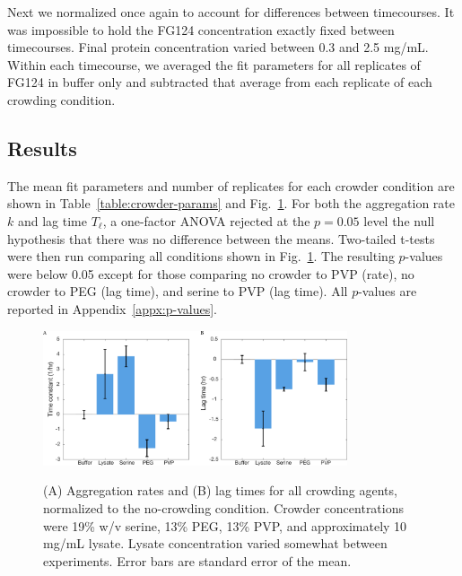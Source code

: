 Next we normalized once again to account for differences between timecourses.  It was impossible to hold the FG124 concentration exactly fixed between timecourses.  Final protein concentration varied between 0.3 and 2.5 mg/mL. Within each timecourse, we averaged the fit parameters for all replicates of FG124 in buffer only and subtracted that average from each replicate of each crowding condition.

\subsection{Results}

The mean fit parameters and number of replicates for each crowder condition are shown in Table~\ref{table:crowder-params} and Fig.~\ref{fig:tht-all-conditions}.  For both the aggregation rate $k$ and lag time $T_\ell$, a one-factor ANOVA rejected at the $p=0.05$ level the null hypothesis that there was no difference between the means.  Two-tailed t-tests were then run comparing all conditions shown in Fig.~\ref{fig:tht-all-conditions}.  The resulting $p$-values were below 0.05 except for those comparing no crowder to PVP (rate), no crowder to PEG (lag time), and serine to PVP (lag time).  All $p$-values are reported in Appendix~\ref{appx:p-values}.


\begin{figure}
\caption[Aggregation rates and lag times for all crowding agents.]{(A) Aggregation rates and (B) lag times for all crowding agents, normalized to the no-crowding condition.  Crowder concentrations were 19\% w/v serine, 13\% PEG, 13\% PVP, and approximately 10 mg/mL lysate.  Lysate concentration varied somewhat between experiments. Error bars are standard error of the mean.}
\centering
\includegraphics[width=0.8\textwidth]{figs/ch05/barCharts.pdf}
\label{fig:tht-all-conditions}
\end{figure}

